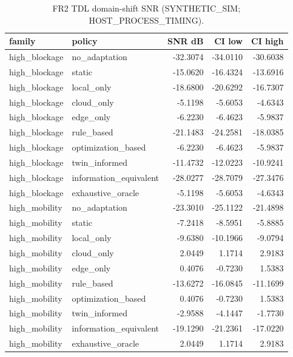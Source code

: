 \begin{table}[h]\centering
\caption{FR2 TDL domain-shift SNR (SYNTHETIC\_SIM; HOST\_PROCESS\_TIMING).}
\begin{tabular}{llrrr}\toprule family & policy & SNR dB & CI low & CI high \\\midrule
high\_blockage & no\_adaptation & -32.3074 & -34.0110 & -30.6038 \\
high\_blockage & static & -15.0620 & -16.4324 & -13.6916 \\
high\_blockage & local\_only & -18.6800 & -20.6292 & -16.7307 \\
high\_blockage & cloud\_only & -5.1198 & -5.6053 & -4.6343 \\
high\_blockage & edge\_only & -6.2230 & -6.4623 & -5.9837 \\
high\_blockage & rule\_based & -21.1483 & -24.2581 & -18.0385 \\
high\_blockage & optimization\_based & -6.2230 & -6.4623 & -5.9837 \\
high\_blockage & twin\_informed & -11.4732 & -12.0223 & -10.9241 \\
high\_blockage & information\_equivalent & -28.0277 & -28.7079 & -27.3476 \\
high\_blockage & exhaustive\_oracle & -5.1198 & -5.6053 & -4.6343 \\
high\_mobility & no\_adaptation & -23.3010 & -25.1122 & -21.4898 \\
high\_mobility & static & -7.2418 & -8.5951 & -5.8885 \\
high\_mobility & local\_only & -9.6380 & -10.1966 & -9.0794 \\
high\_mobility & cloud\_only & 2.0449 & 1.1714 & 2.9183 \\
high\_mobility & edge\_only & 0.4076 & -0.7230 & 1.5383 \\
high\_mobility & rule\_based & -13.6272 & -16.0845 & -11.1699 \\
high\_mobility & optimization\_based & 0.4076 & -0.7230 & 1.5383 \\
high\_mobility & twin\_informed & -2.9588 & -4.1447 & -1.7730 \\
high\_mobility & information\_equivalent & -19.1290 & -21.2361 & -17.0220 \\
high\_mobility & exhaustive\_oracle & 2.0449 & 1.1714 & 2.9183 \\
\bottomrule\end{tabular}\end{table}
